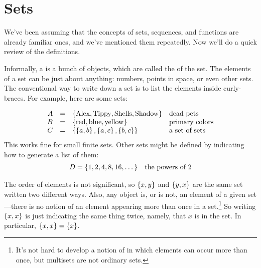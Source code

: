 \label{sets_chap}

\section{Sets}

We've been assuming that the concepts of sets, sequences, and functions are
already familiar ones, and we've mentioned them repeatedly.  Now we'll do a
quick review of the definitions.

\iffalse

Propositions of the sort we've considered so far are good for
reasoning about individual statements, but not so good for reasoning
about a collection of objects.  Let's first review a couple
mathematical tools for grouping objects and then extend our logical
language to cope with such collections.
\fi

Informally, a  is a bunch of objects, which are called the
 of the set.  The elements of a set can be just about
anything: numbers, points in space, or even other sets.  The conventional
way to write down a set is to list the elements inside curly-braces.  For
example, here are some sets:

\[
\begin{array}{rcll}
A & = & \left\{\text{Alex}, \text{Tippy}, \text{Shells}, \text{Shadow}\right\} & \text{dead pets} \\
B & = & \left\{\text{red}, \text{blue}, \text{yellow}\right\} & \text{primary colors} \\
C & = & \left\{ \left\{a, b\right\}, \left\{a, c\right\}, \left\{b, c\right\}\right\} & \text{a set of sets}
\end{array}
\]
This works fine for small finite sets.  Other sets might be defined by
indicating how to generate a list of them:
\begin{align*}
D & =  \left\{1,2,4,8,16,\dots\right\} & \text{the powers of 2}
\end{align*}

The order of elements is not significant, so $\left\{x, y\right\}$ and $\left\{y, x\right\}$
are the same set written two different ways.  Also, any object is, or is
not, an element of a given set ---there is no notion of an element
appearing more than once in a set.\footnote{It's not hard to develop a
notion of  in which elements can occur more than once, but
multisets are not ordinary sets.}  So writing $\left\{x,x\right\}$ is just
indicating the same thing twice, namely, that $x$ is in the set.  In
particular, $\left\{x,x\right\} = \left\{x\right\}$.

